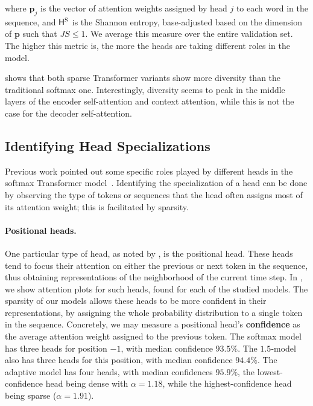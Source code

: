 where $\bm{p}_j$ is the vector of attention weights assigned by head
$j$ to each word in the sequence, and $\mathsf{H}^\textsc{S}$ is the Shannon entropy,
base-adjusted based on the dimension of $\bm{p}$ such that $JS \leq
    1$. We average this measure over the entire validation set. The
higher this metric is, the more the heads are taking different roles
in the model.

 shows that both sparse Transformer variants show
more diversity than the traditional softmax one. Interestingly,
diversity seems to peak in the middle layers of the encoder
self-attention and context attention, while this is not the case for
the decoder self-attention.

\subsection{Identifying Head Specializations}

Previous work pointed out some specific roles played by
different heads in the softmax Transformer
model~\citep{voita2018context,tang2018why,specialized}. Identifying
the specialization of a head can be done by observing the
type of tokens or sequences that the head often assigns most
of its attention weight; this is facilitated by sparsity.

\paragraph*{Positional heads.}
One particular type of head, as noted by \citet{specialized}, is the
positional head. These heads tend to focus their attention on either
the previous or next token in the sequence, thus obtaining
representations of the neighborhood of the current time step. In
, we show attention plots for such heads, found for
each of the studied models. The sparsity of our models allows these
heads to be more confident in their representations, by assigning the
whole probability distribution to a single token in the sequence.
Concretely, we may measure a positional head's \textbf{confidence} as
the average attention weight assigned to the previous token. The
softmax model has three heads for position $-1$, with median
confidence $93.5\%$. The $1.5$-\entmaxtext model also has three heads
for this position, with median confidence $94.4\%$. The adaptive
model has four heads, with median confidences $95.9\%$, the
lowest-confidence head being dense with $\alpha=1.18$, while the
highest-confidence head being sparse ($\alpha=1.91$).

